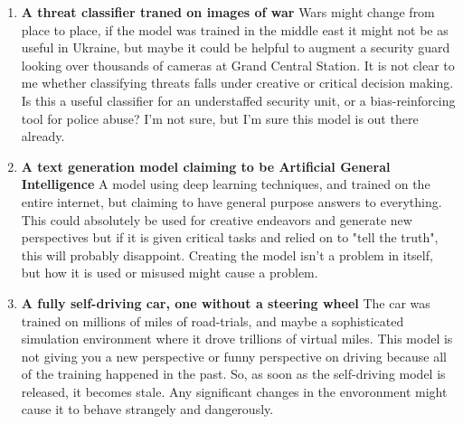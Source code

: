\begin{enumerate}
    \item \textbf{A threat classifier traned on images of war} Wars might change from place to place, if the model was trained in the middle east it might not be as useful in Ukraine, but maybe it could be helpful to augment a security guard looking over thousands of cameras at Grand Central Station. It is not clear to me whether classifying threats falls under creative or critical decision making. Is this a useful classifier for an understaffed security unit, or a bias-reinforcing tool for police abuse? I'm not sure, but I'm sure this model is out there already.
    \item \textbf{A text generation model claiming to be Artificial General Intelligence} A model using deep learning techniques, and trained on the entire internet, but claiming to have general purpose answers to everything. This could absolutely be used for creative endeavors and generate new perspectives but if it is given critical tasks and relied on to "tell the truth", this will probably disappoint. Creating the model isn't a problem in itself, but how it is used or misused might cause a problem.
    \item \textbf{A fully self-driving car, one without a steering wheel} The car was trained on millions of miles of road-trials, and maybe a sophisticated simulation environment where it drove trillions of virtual miles. This model is not giving you a new perspective or funny perspective on driving because all of the training happened in the past. So, as soon as the self-driving model is released, it becomes stale. Any significant changes in the envoronment might cause it to behave strangely and dangerously.
\end{enumerate}
